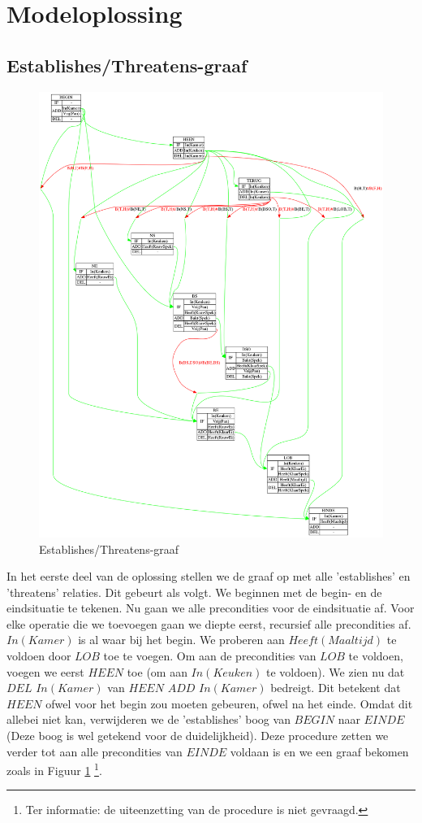 \documentclass[alternative-exam.tex]{subfiles}
\begin{document}
\section{Modeloplossing}
\subsection{Establishes/Threatens-graaf}
\begin{figure}[p]
\centering
\caption{Establishes/Threatens-graaf}
\label{strips_1}
\includegraphics[scale=0.25]{resources/graphs/strips_1.png}
\end{figure}
In het eerste deel van de oplossing stellen we de graaf op met alle 'establishes' en 'threatens' relaties. Dit gebeurt als volgt. We beginnen met de begin- en de eindsituatie te tekenen. Nu gaan we alle precondities voor de eindsituatie af. Voor elke operatie die we toevoegen gaan we diepte eerst, recursief alle precondities af. $In(Kamer)$ is al waar bij het begin. We proberen aan $Heeft(Maaltijd)$ te voldoen door $LOB$ toe te voegen. Om aan de precondities van $LOB$ te voldoen, voegen we eerst $HEEN$ toe (om aan $In(Keuken)$ te voldoen). We zien nu dat $DEL$ $In(Kamer)$ van $HEEN$ $ADD$ $In(Kamer)$ bedreigt. Dit betekent dat $HEEN$ ofwel voor het begin zou moeten gebeuren, ofwel na het einde. Omdat dit allebei niet kan, verwijderen we de 'establishes' boog van $BEGIN$ naar $EINDE$ (Deze boog is wel getekend voor de duidelijkheid). Deze procedure zetten we verder tot aan alle precondities van $EINDE$ voldaan is en we een graaf bekomen zoals in Figuur \ref{strips_1} \footnote{Ter informatie: de uiteenzetting van de procedure is niet gevraagd.}.
\end{document}
